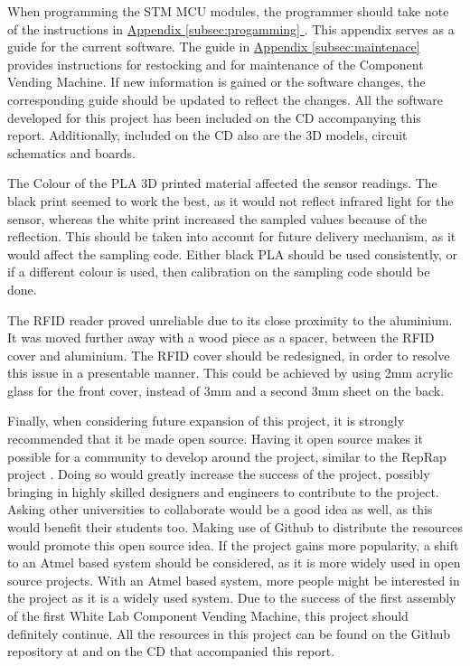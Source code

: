 \documentclass[a4paper,11pt]{article}
\newcommand*{\fullref}[1]{\hyperref[{#1}]{\Appendixautorefname  \ref*{#1} \nameref*{#1}}}
\newcommand*{\Appendixautorefname}{Appendix }
\numberwithin{figure}{section}
\numberwithin{table}{section}
\begin{document}
When programming the STM MCU modules, the programmer should take note of the instructions in \fullref{subsec:progamming}. This appendix serves as a guide for the current software. The guide in \fullref{subsec:maintenace} provides instructions for restocking and for maintenance of the Component Vending Machine. If new information is gained or the software changes, the corresponding guide should be updated to reflect the changes. All the software developed for this project has been included on the CD accompanying this report. Additionally, included on the CD also are the 3D models, circuit schematics and boards.

The Colour of the PLA 3D printed material affected the sensor readings. The black print seemed to work the best, as it would not reflect infrared light for the sensor, whereas the white print increased the sampled values because of the reflection. This should be taken into account for future delivery mechanism, as it would affect the sampling code. Either black PLA should be used consistently, or if a different colour is used, then calibration on the sampling code should be done.

The RFID reader proved unreliable due to its close proximity to the aluminium. It was moved further away with a wood piece as a spacer, between the RFID cover and aluminium. The RFID cover should be redesigned, in order to resolve this issue in a presentable manner. This could be achieved by using 2mm acrylic glass for the front cover, instead of 3mm and a second 3mm sheet on the back. 

Finally, when considering future expansion of this project, it is strongly recommended that it be made open source. Having it open source makes it possible for a community to develop around the project, similar to the RepRap project \cite{reprap}. Doing so would greatly increase the success of the project, possibly bringing in highly skilled designers and engineers to contribute to the project. Asking other universities to collaborate would be a good idea as well, as this would benefit their students too. Making use of Github to distribute the resources would promote this open source idea. If the project gains more popularity, a shift to an Atmel based system should be considered, as it is more widely used in open source projects. With an Atmel based system, more people might be interested in the project as it is a widely used system. Due to the success of the first assembly of the first White Lab Component Vending Machine, this project should definitely continue. All the resources in this project can be found on the Github repository at \cite{github} and on the CD that accompanied this report.
\newpage
\end{document}
